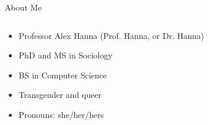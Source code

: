 \documentclass{beamer}
\begin{document}
\begin{frame}{About Me}
  \begin{columns}
    \begin{column}{0.5\textwidth}
        \begin{itemize}[<+->]
          \item Professor Alex Hanna (Prof. Hanna, or Dr. Hanna)
          \item PhD and MS in Sociology
          \item BS in Computer Science
          \item Transgender and queer
          \item Pronouns: she/her/hers
        \end{itemize}
    \end{column}
    \begin{column}{0.5\textwidth}
    \end{column}
  \end{columns}
\end{frame}
\end{document}
